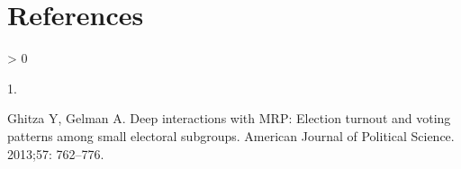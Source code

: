 \documentclass[10pt,letterpaper]{article}
\newlength{\csllabelwidth}
\newlength{\cslhangindent}
\newenvironment{CSLReferences}[2] %
 {%
  \setlength{\parindent}{0pt}
  \ifodd #1 \everypar{\setlength{\hangindent}{\cslhangindent}}\ignorespaces\fi
  \ifnum #2 > 0
  \setlength{\parskip}{#2\baselineskip}
  \fi
 }%
 {}
\newcommand{\CSLLeftMargin}[1]{\parbox[t]{\csllabelwidth}{#1}}
\newcommand{\CSLRightInline}[1]{\parbox[t]{\linewidth - \csllabelwidth}{#1}\break}
\begin{document}
\clearpage

\hypertarget{references}{%
\section*{References}\label{references}}

\hypertarget{refs}{}
\begin{CSLReferences}{0}{0}
\leavevmode\hypertarget{ref-ghitza2013deep}{}%
\CSLLeftMargin{1. }
\CSLRightInline{Ghitza Y, Gelman A. Deep interactions with {MRP}:
Election turnout and voting patterns among small electoral subgroups.
American Journal of Political Science. 2013;57: 762--776. }

\end{CSLReferences}

\nolinenumbers
\end{document}
